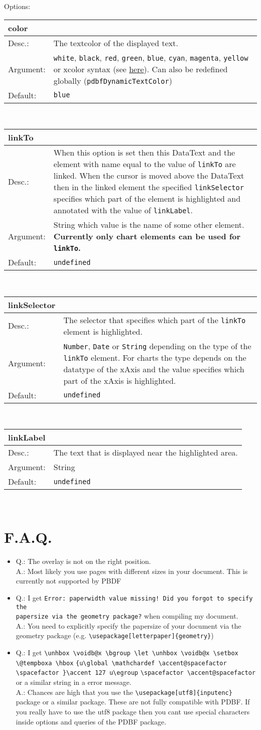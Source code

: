 \documentclass[11pt]{scrartcl}
\def\a{5cm}
\def\b{10.5cm}
\def\option#1#2#3#4{%
\noindent \begin{tabular}{|p{\a}|p{\b}|}
\hline
\textbf{#1} & \\
\hline
Desc.: & #2 \\
\hline
Argument: & #3\\
\hline
Default:& #4\\
\hline
\end{tabular} \\[4pt]%
}
\begin{document}
\noindent Options: \\[3pt]

\option
{color}
{The textcolor of the displayed text.}
{\texttt{white}, \texttt{black}, \texttt{red}, \texttt{green}, \texttt{blue}, \texttt{cyan}, \texttt{magenta}, \texttt{yellow} or xcolor syntax (see \href{http://mirror.unicorncloud.org/CTAN/macros/latex/contrib/xcolor/xcolor.pdf}{here}). Can also be redefined globally (\texttt{pdbfDynamicTextColor})}
{\texttt{blue}}

\option
{linkTo}
{When this option is set then this DataText and the element with name equal to the value of \texttt{linkTo} are linked. When the cursor is moved above the DataText then in the linked element the specified \texttt{linkSelector} specifies which part of the element is highlighted and annotated with the value of \texttt{linkLabel}.}
{String which value is the name of some other element. \textbf{Currently only chart elements can be used for \texttt{linkTo}.}}
{\texttt{undefined}}

\option
{linkSelector}
{The selector that specifies which part of the \texttt{linkTo} element is highlighted.}
{\texttt{Number}, \texttt{Date} or \texttt{String} depending on the type of the \texttt{linkTo} element. For charts the type depends on the datatype of the xAxis and the value specifies which part of the xAxis is highlighted.}
{\texttt{undefined}}

\option
{linkLabel}
{The text that is displayed near the highlighted area.}
{String}
{\texttt{undefined}}

\section{F.A.Q.}
\begin{itemize}
\item Q.: The overlay is not on the right position.\\
A.: Most likely you use pages with different sizes in your document. This is currently not supported by PBDF 
\item Q.: I get \verb|Error: paperwidth value missing! Did you forgot to specify the| \\ \verb|papersize via the geometry package?| when compiling my document.\\
A.: You need to explicitly specify the papersize of your document via the geometry package (e.g. \verb|\usepackage[letterpaper]{geometry}|)
\item Q.: I get \verb|\unhbox \voidb@x \bgroup \let \unhbox \voidb@x \setbox \@tempboxa \hbox| \verb|{u\global \mathchardef \accent@spacefactor \spacefactor }\accent 127 u\egroup| \newline \verb|\spacefactor \accent@spacefactor| or a similar string in a error message.\\
A.: Chances are high that you use the \verb|\usepackage[utf8]{inputenc}| package or a similar package. These are not fully compatible with PDBF. If you really have to use the utf8 package then you cant use special characters inside options and queries of the PDBF package.
\end{itemize}
\end{document}
